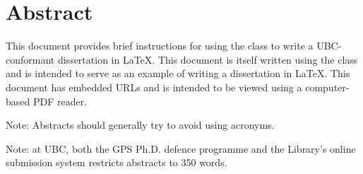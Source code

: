 
\chapter{Abstract}


This document provides brief instructions for using the 
class to write a \acs{UBC}-conformant dissertation in \LaTeX.  This
document is itself written using the  class and is
intended to serve as an example of writing a dissertation in \LaTeX.
This document has embedded \acp{URL} and is intended to be viewed
using a computer-based \ac{PDF} reader.

Note: Abstracts should generally try to avoid using acronyms.

Note: at \ac{UBC}, both the \ac{GPS} Ph.D. defence programme and the
Library's online submission system restricts abstracts to 350
words.

\vfill
\begin{center}
\begin{sf}
\end{sf}
\end{center}
